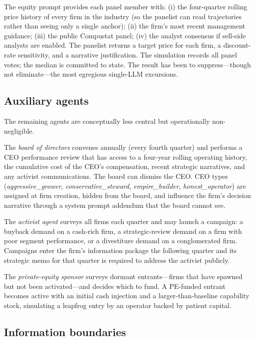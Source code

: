 \documentclass[11pt]{article}
\begin{document}
The equity prompt provides each panel member with: (i) the four-quarter
rolling price history of every firm in the industry (so the panelist can
read trajectories rather than seeing only a single anchor); (ii) the
firm's most recent management guidance; (iii) the public Compustat panel;
(iv) the analyst consensus if sell-side analysts are enabled. The
panelist returns a target price for each firm, a discount-rate sensitivity,
and a narrative justification. The simulation records all panel votes;
the median is committed to state. The result has been to suppress---though
not eliminate---the most egregious single-LLM excursions.

\subsection{Auxiliary agents}

The remaining agents are conceptually less central but operationally
non-negligible.

The \emph{board of directors} convenes annually (every fourth quarter) and
performs a CEO performance review that has access to a four-year rolling
operating history, the cumulative cost of the CEO's compensation, recent
strategic narratives, and any activist communications. The board can
dismiss the CEO. CEO types (\textit{aggressive\_grower},
\textit{conservative\_steward}, \textit{empire\_builder},
\textit{honest\_operator}) are assigned at firm creation, hidden from the
board, and influence the firm's decision narrative through a system
prompt addendum that the board cannot see.

The \emph{activist agent} surveys all firms each quarter and may launch a
campaign: a buyback demand on a cash-rich firm, a strategic-review
demand on a firm with poor segment performance, or a divestiture demand
on a conglomerated firm. Campaigns enter the firm's information package
the following quarter and its strategic memo for that quarter is required
to address the activist publicly.

The \emph{private-equity sponsor} surveys dormant entrants---firms that
have spawned but not been activated---and decides which to fund. A
PE-funded entrant becomes active with an initial cash injection and a
larger-than-baseline capability stock, simulating a leapfrog entry by an
operator backed by patient capital.

\subsection{Information boundaries}
\end{document}
